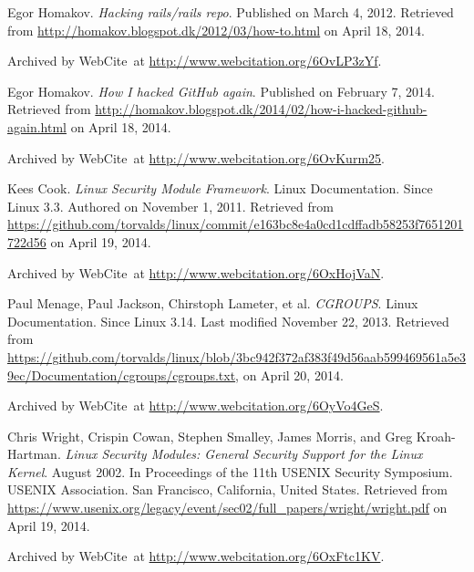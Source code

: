 \begin{thebibliography}{9}
Egor Homakov. \emph{Hacking rails/rails repo}. Published on March 4, 2012.
Retrieved from \url{http://homakov.blogspot.dk/2012/03/how-to.html} on April
18, 2014.

Archived by WebCite\textsuperscript{\textregistered}\ at
\url{http://www.webcitation.org/6OvLP3zYf}.


Egor Homakov. \emph{How I hacked GitHub again}. Published on February 7, 2014.
Retrieved from
\url{http://homakov.blogspot.dk/2014/02/how-i-hacked-github-again.html} on
April 18, 2014.

Archived by WebCite\textsuperscript{\textregistered}\ at
\url{http://www.webcitation.org/6OvKurm25}.


Kees Cook. \emph{Linux Security Module Framework}. Linux Documentation. Since
Linux 3.3. Authored on November 1, 2011. Retrieved from
\url{https://github.com/torvalds/linux/commit/e163bc8e4a0cd1cdffadb58253f7651201722d56}
on April 19, 2014.

Archived by WebCite\textsuperscript{\textregistered}\ at
\url{http://www.webcitation.org/6OxHojVaN}.


Paul Menage, Paul Jackson, Chirstoph Lameter, et al. \emph{CGROUPS}. Linux
Documentation. Since Linux 3.14. Last modified November 22, 2013. Retrieved
from
\url{https://github.com/torvalds/linux/blob/3bc942f372af383f49d56aab599469561a5e39ec/Documentation/cgroups/cgroups.txt},
on April 20, 2014.

Archived by WebCite\textsuperscript{\textregistered}\ at
\url{http://www.webcitation.org/6OyVo4GeS}.


Chris Wright, Crispin Cowan, Stephen Smalley, James Morris, and Greg
Kroah-Hartman. \emph{Linux Security Modules: General Security Support for the
Linux Kernel}. August 2002. In Proceedings of the 11th USENIX Security
Symposium. USENIX Association. San Francisco, California, United States.
Retrieved from
\url{https://www.usenix.org/legacy/event/sec02/full_papers/wright/wright.pdf}
on April 19, 2014.

Archived by WebCite\textsuperscript{\textregistered}\ at
\url{http://www.webcitation.org/6OxFtc1KV}.



\end{thebibliography}
